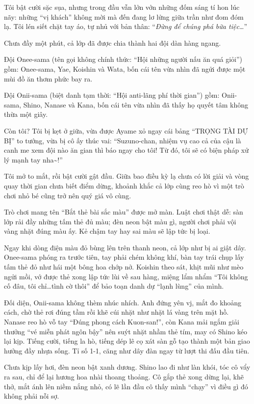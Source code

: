 \documentclass[../main.tex]{subfiles}
\begin{document}
Tôi bật cười sặc sụa, nhưng trong đầu vẫn lởn vởn những đốm sáng tí hon lúc nãy: những ``vị khách'' không mời mà đến đang lơ lửng giữa trần như đom đóm lạ. Tôi lén siết chặt tay áo, tự nhủ với bản thân: ``\textit{Đừng để chúng phá bữa tiệc\dots}''

Chưa đầy một phút, cả lớp đã được chia thành hai đội dàn hàng ngang.

Đội Onee-sama (tên gọi không chính thức: ``Hội những người nấu ăn quá giỏi'') gồm: Onee-sama, Yae, Koishin và Wata, bốn cái tên vừa nhìn đã ngửi được một mùi đồ ăn thơm phức bay ra.

Đội Onii-sama (biệt danh tạm thời: ``Hội anti-lãng phí thời gian'') gồm: Onii-sama, Shino, Nanase và Kana, bốn cái tên vừa nhìn đã thấy họ quyết tâm không thừa một giây.

Còn tôi? Tôi bị kẹt ở giữa, vừa được Ayame xỏ ngay cái bảng ``TRỌNG TÀI DỰ BỊ'' to tướng, vừa bị cô ấy thúc vai: ``Suzuno-chan, nhiệm vụ cao cả của cậu là canh me xem đội nào ăn gian thì báo ngay cho tôi! Từ đó, tôi sẽ có biện pháp xử lý mạnh tay nha\~{}!''

Tôi mở to mắt, rồi bật cười gật đầu. Giữa bao điều kỳ lạ chưa có lời giải và vòng quay thời gian chưa biết điểm dừng, khoảnh khắc cả lớp cùng reo hò vì một trò chơi nhỏ bé cũng trở nên quý giá vô cùng.

Trò chơi mang tên ``Bắt thẻ bài sắc màu'' được mở màn. Luật chơi thật dễ: sàn lớp rải đầy những tấm thẻ đủ màu; đèn neon bật màu gì, người chơi phải vội vàng nhặt đúng màu ấy. Kẻ chậm tay hay sai màu sẽ lập tức bị loại.

Ngay khi dòng điện màu đỏ bùng lên trên thanh neon, cả lớp như bị ai giật dây. Onee-sama phóng ra trước tiên, tay phải chém không khí, bàn tay trái chụp lấy tấm thẻ đỏ như hái một bông hoa chớp nở. Koishin theo sát, khịt mũi như mèo ngửi mồi, vớ được thẻ xong lập tức lùi về sau hàng, miệng lẩm nhẩm ``Tôi không cố đâu, tôi chỉ\dots tình cờ thôi'' để bảo toạn danh dự ``lạnh lùng'' của mình.

Đối diện, Onii-sama không thèm nhúc nhích. Anh đứng yên vj, mắt đo khoảng cách, chờ thẻ rơi đúng tầm rồi khẽ cúi nhặt như nhặt lá vàng trên mặt hồ. Nanase reo hò vỗ tay ``Đúng phong cách Kuon-san!'', còn Kana mải ngắm giải thưởng ``vé miễn phát ngôn bậy'' nên suýt nhặt nhầm thẻ tím, may có Shino kéo lại kịp. Tiếng cười, tiếng la hò, tiếng dép lê cọ xát sàn gỗ tạo thành một bản giao hưởng đầy nhựa sống. Tỉ số 1-1, căng như dây đàn ngay từ lượt thi đấu đầu tiên.

Chưa kịp lấy hơi, đèn neon bật xanh dương. Shino lao đi như làn khói, tóc cô vẩy ra sau, chỉ để lại hương hoa nhài thoang thoảng. Cô gắp thẻ xong dừng lại, khẽ thở, mắt ánh lên niềm nắng nhỏ, có lẽ lần đầu cô thấy mình ``chạy'' vì điều gì đó không phải nỗi sợ.
\end{document}
